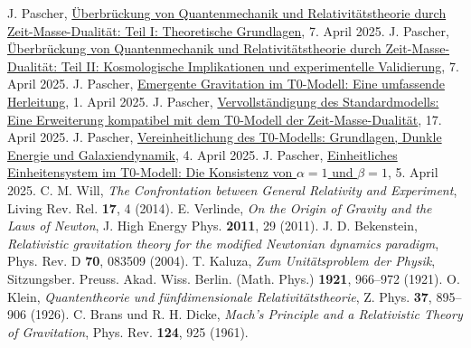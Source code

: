 \documentclass[12pt,a4paper]{article}
\begin{document}
	\begin{thebibliography}{99}
		 J. Pascher, \href{https://github.com/jpascher/T0-Time-Mass-Duality/tree/main/2/pdf/Deutsch/QMRelZeitMasseTeil1.pdf}{Überbrückung von Quantenmechanik und Relativitätstheorie durch Zeit-Masse-Dualität: Teil I: Theoretische Grundlagen}, 7. April 2025.
		 J. Pascher, \href{https://github.com/jpascher/T0-Time-Mass-Duality/tree/main/2/pdf/Deutsch/QMRelZeitMasseTeil2.pdf}{Überbrückung von Quantenmechanik und Relativitätstheorie durch Zeit-Masse-Dualität: Teil II: Kosmologische Implikationen und experimentelle Validierung}, 7. April 2025.
		 J. Pascher, \href{https://github.com/jpascher/T0-Time-Mass-Duality/tree/main/2/pdf/Deutsch/EmergentGravT0.pdf}{Emergente Gravitation im T0-Modell: Eine umfassende Herleitung}, 1. April 2025.
		 J. Pascher, \href{https://github.com/jpascher/T0-Time-Mass-Duality/tree/main/2/pdf/Deutsch/StandardModKruemmungRotv.pdf}{Vervollständigung des Standardmodells: Eine Erweiterung kompatibel mit dem T0-Modell der Zeit-Masse-Dualität}, 17. April 2025.
		 J. Pascher, \href{https://github.com/jpascher/T0-Time-Mass-Duality/tree/main/2/pdf/Deutsch/T0VereinheitlichungDEGal.pdf}{Vereinheitlichung des T0-Modells: Grundlagen, Dunkle Energie und Galaxiendynamik}, 4. April 2025.
		 J. Pascher, \href{https://github.com/jpascher/T0-Time-Mass-Duality/tree/main/2/pdf/Deutsch/Alpha1Beta1Konsistenz.pdf}{Einheitliches Einheitensystem im T0-Modell: Die Konsistenz von \(\alpha = 1\) und \(\beta = 1\)}, 5. April 2025.
		 C. M. Will, \textit{The Confrontation between General Relativity and Experiment}, Living Rev. Rel. \textbf{17}, 4 (2014).
		 E. Verlinde, \textit{On the Origin of Gravity and the Laws of Newton}, J. High Energy Phys. \textbf{2011}, 29 (2011).
		 J. D. Bekenstein, \textit{Relativistic gravitation theory for the modified Newtonian dynamics paradigm}, Phys. Rev. D \textbf{70}, 083509 (2004).
		 T. Kaluza, \textit{Zum Unitätsproblem der Physik}, Sitzungsber. Preuss. Akad. Wiss. Berlin. (Math. Phys.) \textbf{1921}, 966–972 (1921).
		 O. Klein, \textit{Quantentheorie und fünfdimensionale Relativitätstheorie}, Z. Phys. \textbf{37}, 895–906 (1926).
		 C. Brans und R. H. Dicke, \textit{Mach's Principle and a Relativistic Theory of Gravitation}, Phys. Rev. \textbf{124}, 925 (1961).

\end{thebibliography}
\end{document}
